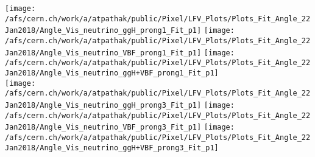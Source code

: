 \documentclass{beamer}
\begin{document}
\begin{frame}
\begin{normalsize}
\begin{center}
\texttt{[image: /afs/cern.ch/work/a/atpathak/public/Pixel/LFV\_Plots/Plots\_Fit\_Angle\_22Jan2018/Angle\_Vis\_neutrino\_ggH\_prong1\_Fit\_p1]}
\texttt{[image: /afs/cern.ch/work/a/atpathak/public/Pixel/LFV\_Plots/Plots\_Fit\_Angle\_22Jan2018/Angle\_Vis\_neutrino\_VBF\_prong1\_Fit\_p1]}
\texttt{[image: /afs/cern.ch/work/a/atpathak/public/Pixel/LFV\_Plots/Plots\_Fit\_Angle\_22Jan2018/Angle\_Vis\_neutrino\_ggH+VBF\_prong1\_Fit\_p1]}\\
\texttt{[image: /afs/cern.ch/work/a/atpathak/public/Pixel/LFV\_Plots/Plots\_Fit\_Angle\_22Jan2018/Angle\_Vis\_neutrino\_ggH\_prong3\_Fit\_p1]}
\texttt{[image: /afs/cern.ch/work/a/atpathak/public/Pixel/LFV\_Plots/Plots\_Fit\_Angle\_22Jan2018/Angle\_Vis\_neutrino\_VBF\_prong3\_Fit\_p1]}
\texttt{[image: /afs/cern.ch/work/a/atpathak/public/Pixel/LFV\_Plots/Plots\_Fit\_Angle\_22Jan2018/Angle\_Vis\_neutrino\_ggH+VBF\_prong3\_Fit\_p1]}\\
\end{center}
\end{normalsize}
\end {frame}
\end{document}

